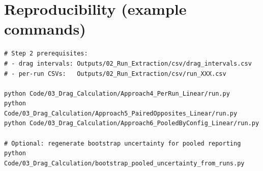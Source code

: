\documentclass[11pt,a4paper]{article}
\begin{document}
\section{Reproducibility (example commands)}
\begin{verbatim}
# Step 2 prerequisites:
# - drag intervals: Outputs/02_Run_Extraction/csv/drag_intervals.csv
# - per-run CSVs:   Outputs/02_Run_Extraction/csv/run_XXX.csv

python Code/03_Drag_Calculation/Approach4_PerRun_Linear/run.py
python Code/03_Drag_Calculation/Approach5_PairedOpposites_Linear/run.py
python Code/03_Drag_Calculation/Approach6_PooledByConfig_Linear/run.py

# Optional: regenerate bootstrap uncertainty for pooled reporting
python Code/03_Drag_Calculation/bootstrap_pooled_uncertainty_from_runs.py
\end{verbatim}
\end{document}
